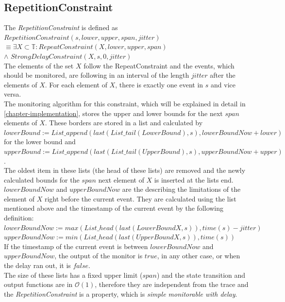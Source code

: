 \subsection{RepetitionConstraint}
	The \emph{RepetitionConstraint} is defined as\\[10pt]
		$RepetitionConstraint(s, lower, upper, span, jitter)$\\
		$\equiv \exists X\subset \mathbb{T}: RepeatConstraint (X, lower, upper, span)$\\
		\hspace{7cm}$\land$ $StrongDelayConstraint(X, s, 0, jitter)$\\[10pt]
	The elements of the set $X$ follow the RepeatConstraint and the events, which should be monitored, are following in an interval of the length $jitter$ after the elements of $X$. For each element of $X$, there is exactly one event in $s$ and vice versa.\\
	The monitoring algorithm for this constraint, which will be explained in detail in \ref{chapter-implementation}, stores the upper and lower bounds for the next $span$ elements of $X$.
	These borders are stored in a list and calculated by\\[10pt]
	$lowerBound:= List\_append(last(List\_tail(LowerBound), s), lowerBoundNow + lower)$ for the lower bound and\\
	$upperBound:= List\_append(last(List\_tail(UpperBound), s), upperBoundNow + upper)$.\\[10pt]
	The oldest item in these lists (the head of these lists) are removed and the newly calculated bounds for the $span$ next element of $X$ is inserted at the lists end. $lowerBoundNow$ and $upperBoundNow$ are the describing the limitations of the element of $X$ right before the current event. They are calculated using the list mentioned above and the timestamp of the current event by the following definition:\\[10pt]
	$lowerBoundNow:= max(List\_head(last(LowerBoundX, s)), time(s)-jitter)$\\
	$upperBoundNow:= min(List\_head(last(UpperBoundX, s)), time(s))$\\[10pt]
	If the timestamp of the current event is between $lowerBoundNow$ and $upperBoundNow$, the output of the monitor is $true$, in any other case, or when the delay ran out, it is $false$.\\
	The size of these lists has a fixed upper limit ($span$) and the state transition and output functions are in $\mathcal{O}(1)$, therefore they are independent from the trace and the \emph{RepetitionConstraint} is a property, which is \textit{simple monitorable with delay}.
	
